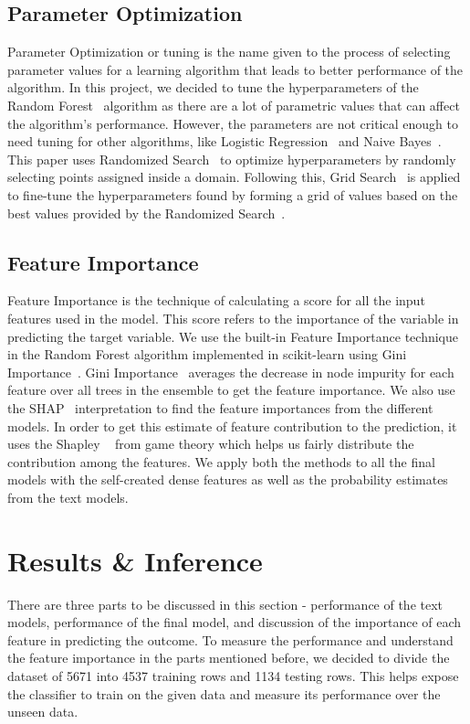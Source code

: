 \documentclass[runningheads]{llncs}
\begin{document}
\subsection{Parameter Optimization} 
Parameter Optimization or tuning is the name given to the process of selecting parameter values for a learning algorithm that leads to better performance of the algorithm. In this project, we decided to tune the hyperparameters of the Random Forest~\cite{rf} algorithm as there are a lot of parametric values that can affect the algorithm's performance. However, the parameters are not critical enough to need tuning for other algorithms, like Logistic Regression~\cite{lr} and Naive Bayes~\cite{nb}. This paper uses Randomized Search~\cite{rand_search} to optimize hyperparameters by randomly selecting points assigned inside a domain. Following this, Grid Search~\cite{rand_search} is applied to fine-tune the hyperparameters found by forming a grid of values based on the best values provided by the Randomized Search~\cite{rand_search}.
\subsection{Feature Importance}
Feature Importance is the technique of calculating a score for all the input features used in the model. This score refers to the importance of the variable in predicting the target variable.
We use the built-in Feature Importance technique in the Random Forest algorithm implemented in scikit-learn using Gini Importance~\cite{gini}. Gini Importance~\cite{gini} averages the decrease in node impurity for each feature over all trees in the ensemble to get the feature importance. We also use the SHAP~\cite{shap} interpretation to find the feature importances from the different models. In order to get this estimate of feature contribution to the prediction, it uses the Shapley ~\cite{shap} from game theory which helps us fairly distribute the contribution among the features. We apply both the methods to all the final models with the self-created dense features as well as the probability estimates from the text models.

\section{Results \& Inference}
There are three parts to be discussed in this section - performance of the text models, performance of the final model, and discussion of the importance of each feature in predicting the outcome. To measure the performance and understand the feature importance in the parts mentioned before, we decided to divide the dataset of 5671 into 4537 training rows and 1134 testing rows. This helps expose the classifier to train on the given data and measure its performance over the unseen data.
\end{document}
